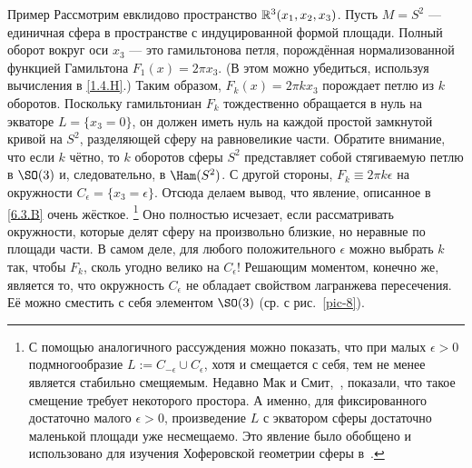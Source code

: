\begin{ex}{Пример}\label{6.3.C}
Рассмотрим евклидово пространство $\mathbb{R}^3 (x_1, x_2, x_3)$.
Пусть $M = S^2$ — единичная сфера в пространстве с
индуцированной формой площади. 
Полный оборот вокруг оси $x_3$ — это гамильтонова петля, порождённая
нормализованной функцией Гамильтона $F_1 (x) = 2\pi x_3$. 
(В этом можно убедиться, используя вычисления в \ref{1.4.H}.)
Таким образом, $F_k (x) = 2\pi k x_3$ порождает петлю из $k$ оборотов.
Поскольку гамильтониан $F_k$ тождественно обращается в нуль на экваторе $L = \{x_3
= 0\}$, он должен иметь нуль на каждой простой
замкнутой кривой на $S^2$, разделяющей сферу на равновеликие части. 
Обратите внимание, что если $k$ чётно, то $k$ оборотов сферы
$S^2$ представляет собой стягиваемую петлю в $\SO (3)$ и,
следовательно, в $\Ham (S^2)$. 
С другой стороны, $F_k \equiv 2\pi k\epsilon$ на окружности
$C_\epsilon = \{x_3 = \epsilon\}$. 
Отсюда делаем вывод, что явление, описанное в \ref{6.3.B} очень
жёсткое.%
\footnote{
С помощью аналогичного рассуждения можно показать, что при малых
  $\epsilon > 0$ подмногообразие $L:=C_{-\epsilon}\cup C_{\epsilon}$,
  хотя и смещается с себя, тем не менее является стабильно
  смещяемым.
  Недавно Мак и Смит,~\cite{MS}, показали, что такое смещение требует
  некоторого простора. А именно, для фиксированного достаточно малого
  $\epsilon>0$, произведение $L$ с экватором сферы достаточно
  маленькой площади уже несмещаемо. Это явление было обобщено и
  использовано для изучения Хоферовской геометрии сферы в~\cite{PS21}. 
  \dpp}
Оно полностью исчезает, если рассматривать окружности, которые делят
сферу на произвольно близкие, но неравные по площади части. 
В самом деле, для любого положительного $\epsilon$ можно выбрать $k$ так,
чтобы $F_k$, сколь угодно велико на $C_\epsilon$!
Решающим моментом, конечно же, является то, что окружность
$C_\epsilon$ не обладает свойством лагранжева пересечения. 
Её можно сместить с себя элементом $\SO (3)$ (ср. с рис.~\ref{pic-8}). 
\end{ex}
